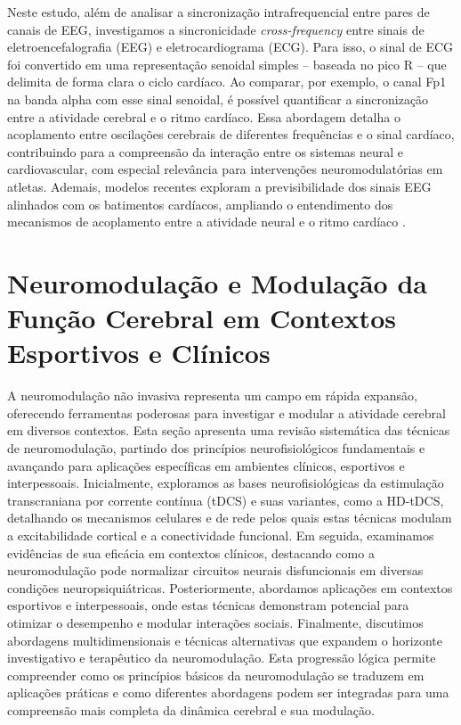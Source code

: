 Neste estudo, além de analisar a sincronização intrafrequencial entre pares de canais de EEG, investigamos a sincronicidade \textit{cross-frequency} entre sinais de eletroencefalografia (EEG) e eletrocardiograma (ECG). Para isso, o sinal de ECG foi convertido em uma representação senoidal simples – baseada no pico R – que delimita de forma clara o ciclo cardíaco. Ao comparar, por exemplo, o canal Fp1 na banda alpha com esse sinal senoidal, é possível quantificar a sincronização entre a atividade cerebral e o ritmo cardíaco. Essa abordagem detalha o acoplamento entre oscilações cerebrais de diferentes frequências e o sinal cardíaco, contribuindo para a compreensão da interação entre os sistemas neural e cardiovascular, com especial relevância para intervenções neuromodulatórias em atletas. Ademais, modelos recentes exploram a previsibilidade dos sinais EEG alinhados com os batimentos cardíacos, ampliando o entendimento dos mecanismos de acoplamento entre a atividade neural e o ritmo cardíaco \cite{vergara2024exploring}.

\section{Neuromodulação e Modulação da Função Cerebral em Contextos Esportivos e Clínicos}
A neuromodulação não invasiva representa um campo em rápida expansão, oferecendo ferramentas poderosas para investigar e modular a atividade cerebral em diversos contextos. Esta seção apresenta uma revisão sistemática das técnicas de neuromodulação, partindo dos princípios neurofisiológicos fundamentais e avançando para aplicações específicas em ambientes clínicos, esportivos e interpessoais. Inicialmente, exploramos as bases neurofisiológicas da estimulação transcraniana por corrente contínua (tDCS) e suas variantes, como a HD-tDCS, detalhando os mecanismos celulares e de rede pelos quais estas técnicas modulam a excitabilidade cortical e a conectividade funcional. Em seguida, examinamos evidências de sua eficácia em contextos clínicos, destacando como a neuromodulação pode normalizar circuitos neurais disfuncionais em diversas condições neuropsiquiátricas. Posteriormente, abordamos aplicações em contextos esportivos e interpessoais, onde estas técnicas demonstram potencial para otimizar o desempenho e modular interações sociais. Finalmente, discutimos abordagens multidimensionais e técnicas alternativas que expandem o horizonte investigativo e terapêutico da neuromodulação. Esta progressão lógica permite compreender como os princípios básicos da neuromodulação se traduzem em aplicações práticas e como diferentes abordagens podem ser integradas para uma compreensão mais completa da dinâmica cerebral e sua modulação.

